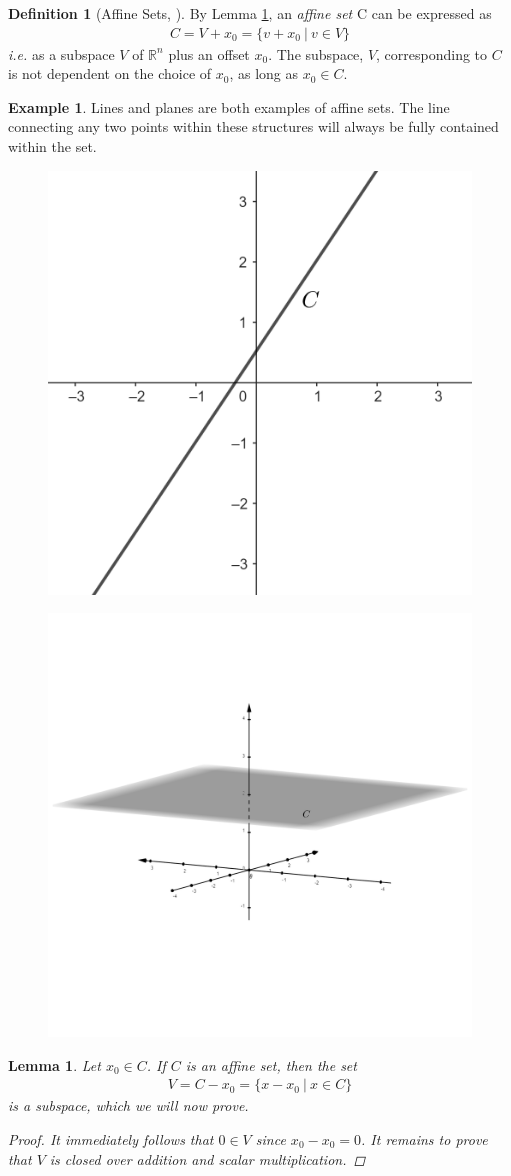 \documentclass[11pt,reqno]{amsart}
\newcommand{\R}{\mathbb{R}}
\theoremstyle{plain}
\newtheorem{lemma}[theorem]{Lemma}
\theoremstyle{definition}
\newtheorem{example}[theorem]{Example}
\newtheorem{definition}[theorem]{Definition}
\begin{document}
{\begin{definition}[{Affine Sets, \cite[2.1.2]{boyd_vandenberghe_2004}}]
    By Lemma \ref{lem:aff}, an \emph{affine set} C can be expressed as
    \begin{align*}
        C = V + x_0 = \{v + x_0\ |\ v\in V\}
    \end{align*}
    \emph{i.e.} as a subspace $V$ of $\R^n$ plus an offset $x_0$. The subspace, $V$, corresponding to $C$ is not dependent on the choice of $x_0$, as long as $x_0\in C$.
\end{definition}
\smallskip
\begin{example}
    Lines and planes are both examples of affine sets. The line connecting any two points within these structures will always be fully contained within the set.
    \begin{figure}[h]
    \centering
    \begin{minipage}{.5\textwidth}
      \centering
      \includegraphics[height = 1.7 in]{affine2.png}
      \label{fig:test1}
    \end{minipage}%
    \begin{minipage}{.5\textwidth}
      \centering
      \includegraphics[height = 1.7 in]{affineset.png}
      \label{fig:test2}
    \end{minipage}
    \end{figure}
\end{example}
\smallskip
\begin{lemma} 
    \label{lem:aff}
    Let $x_0 \in C$. If $C$ is an affine set, then the set
    \begin{align*}
        V = C - x_0 = \{x - x_0\ |\ x\in C\}
    \end{align*}
    is a subspace, which we will now prove. 
    \begin{proof}
        It immediately follows that $0\in V$ since $x_0-x_0=0$. It remains to prove that $V$ is closed over addition and scalar multiplication.
        

\end{proof}
\end{lemma}}
\end{document}
